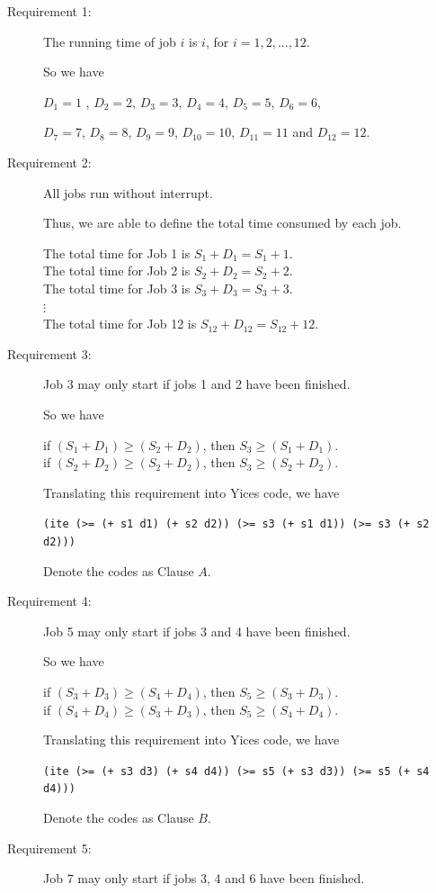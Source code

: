 \documentclass[11pt]{article}
\begin{document}
\begin{description}
  \item[Requirement 1:] The running time of job $i$ is $i$, for $i = 1, 2, . . . , 12$.

  So we have

  $D_{1}=1$ , $D_{2}=2$, $D_{3}=3$, $D_{4}=4$, $D_{5}=5$, $D_{6}=6$,

  $D_{7}=7$, $D_{8}=8$, $D_{9}=9$, $D_{10}=10$, $D_{11}=11$ and $D_{12}=12$.
  \item[Requirement 2:] All jobs run without interrupt.

  Thus, we are able to define the total time consumed by each job. \\
    \begin{center}
    The total time for Job 1 is $S_{1}+D_{1}=S_{1}+1$.\\
    The total time for Job 2 is $S_{2}+D_{2}=S_{2}+2$.\\
    The total time for Job 3 is $S_{3}+D_{3}=S_{3}+3$.\\
    $\vdots$\\
    The total time for Job 12 is $S_{12}+D_{12}=S_{12}+12$.
    \end{center}
  \item[Requirement 3:] Job 3 may only start if jobs 1 and 2 have been finished.

  So we have
  \begin{center}
  if $(S_{1}+D_{1}) \geq (S_{2}+D_{2})$, then $S_{3} \geq (S_{1}+D_{1})$.\\
  if $(S_{2}+D_{2}) \geq (S_{2}+D_{2})$, then $S_{3} \geq (S_{2}+D_{2})$.
  \end{center}
  Translating this requirement into Yices code, we have
  \begin{center}
  {\tt (ite (>= (+ s1 d1) (+ s2 d2)) (>= s3 (+ s1 d1)) (>= s3 (+ s2 d2)))}
  \end{center}
  Denote the codes as Clause $A$.
  \item[Requirement 4:] Job 5 may only start if jobs 3 and 4 have been finished.

  So we have
  \begin{center}
  if $(S_{3}+D_{3}) \geq (S_{4}+D_{4})$, then $S_{5} \geq (S_{3}+D_{3})$.\\
  if $(S_{4}+D_{4}) \geq (S_{3}+D_{3})$, then $S_{5} \geq (S_{4}+D_{4})$.
  \end{center}
  Translating this requirement into Yices code, we have
  \begin{center}
  {\tt (ite (>= (+ s3 d3) (+ s4 d4)) (>= s5 (+ s3 d3)) (>= s5 (+ s4 d4)))}
  \end{center}
  Denote the codes as Clause $B$.
  \item[Requirement 5:] Job 7 may only start if jobs 3, 4 and 6 have been finished.


\end{description}
\end{document}
